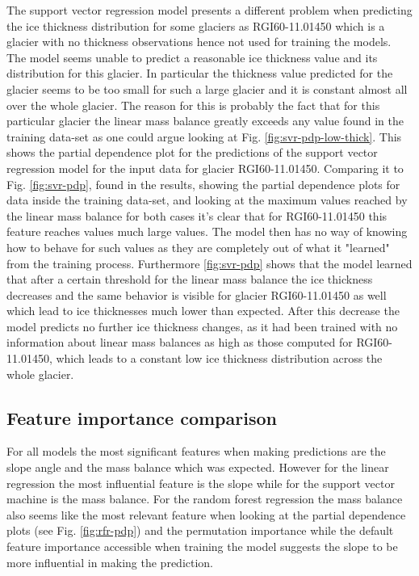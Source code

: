 The support vector regression model presents a different problem when predicting the ice thickness distribution for some glaciers as RGI60-11.01450 which is a glacier with no thickness observations hence not used for training the models. The model seems unable to predict a reasonable ice thickness value and its distribution for this glacier. In particular the thickness value predicted for the glacier seems to be too small for such a large glacier and it is constant almost all over the whole glacier. The reason for this is probably the fact that for this particular glacier the linear mass balance greatly exceeds any value found in the training data-set as one could argue looking at Fig. \ref{fig:svr-pdp-low-thick}. This shows the partial dependence plot for the predictions of the support vector regression model for the input data for glacier RGI60-11.01450. Comparing it to Fig. \ref{fig:svr-pdp}, found in the results, showing the partial dependence plots for data inside the training data-set, and looking at the maximum values reached by  the linear mass balance for both cases it's clear that for RGI60-11.01450 this feature reaches values much large values. The model then has no way of knowing how to behave for such values as they are completely out of what it "learned" from the training process. Furthermore \ref{fig:svr-pdp} shows that the model learned that after a certain threshold for the linear mass balance the ice thickness decreases and the same behavior is visible for glacier RGI60-11.01450 as well which lead to ice thicknesses much lower than expected. After this decrease the model predicts no further ice thickness changes, as it had been trained with no information about linear mass balances as high as those computed for RGI60-11.01450, which leads to a constant low ice thickness distribution across the whole glacier.


\subsection{Feature importance comparison}
For all models the most significant features when making predictions are the slope angle and the mass balance which was expected. However for the linear regression the most influential feature is the slope while for the support  vector machine is the mass balance. For the random forest regression the mass balance also seems like the most relevant feature when looking at the partial dependence plots (see Fig. \ref{fig:rfr-pdp}) and the permutation importance while the default feature importance accessible when training the model suggests the slope to be more influential in making the prediction.

